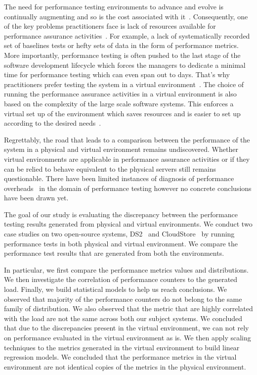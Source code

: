 The need for performance testing environments to advance and evolve is continually augmenting and so is the cost associated with it~\cite{stpmag, bertolino2007software}. Consequently, one of the key problems practitioners face is lack of resources available for performance assurance activities~\cite{5306331}. For example, a lack of systematically recorded set of baselines tests or hefty sets of data in the form of performance metrics. More importantly, performance testing is often pushed to the last stage of the software development lifecycle which forces the managers to dedicate a minimal time for performance testing which can even span out to days. That's why practitioners prefer testing the system in a virtual environment~\cite{whyvirtualisbetter, vmwarehighcost}. The choice of running the performance assurance activities in a virtual environment is also based on the complexity of the large scale software systems. This enforces a virtual set up of the environment which saves resources and is easier to set up according to the desired needs~\cite{VMWarePowerCLIBlog, seetharaman2006test}. 

Regrettably, the road that leads to a comparison between the performance of the system in a physical and virtual environment remains undiscovered. Whether virtual environments are applicable in performance assurance activities or if they can be relied to behave equivalent to the physical servers still remains questionable. There have been limited instances of diagnosis of performance overheads~\cite{menon2005diagnosing} in the domain of performance testing however no concrete conclusions have been drawn yet. 

The goal of our study is evaluating the discrepancy between the performance testing results generated from physical and virtual environments. 
We conduct two case studies on two open-source systems, DS2~\cite{delldvd} and CloudStore~\cite{cloudstore} by running performance tests in both physical and virtual environment. We compare the performance test results that are generated from both the environments.

In particular, we first compare the performance metrics values and distributions. We then investigate the correlation of performance counters to the generated load. Finally, we build statistical models to help us reach conclusions. 
We observed that majority of the performance counters do not belong to the same family of distribution. We also observed that the metric that are highly correlated with the load are not the same across both our subject systems.
We concluded that due to the discrepancies present in the virtual environment, we can not rely on performance evaluated in the virtual environment as is. We then apply scaling techniques to the metrics generated in the virtual environment to build linear regression models. We concluded that the performance metrics in the virtual environment are not identical copies of the metrics in the physical environment. 


